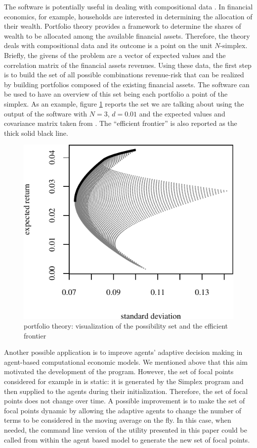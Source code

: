 \documentclass{jors}
\begin{document}
The software is potentially useful in dealing with compositional data \cite{coda15}. In financial economics, for example, households are interested in determining the allocation of their wealth. Portfolio theory provides a framework to determine the shares of wealth to be allocated among the available financial assets. Therefore, the theory deals with compositional data and its outcome is a point on the unit $N$-simplex. 
Briefly, the givens of the problem are a vector of expected values and the correlation matrix of the financial assets revenues. Using these data, the first step is to build the set of all possible combinations revenue-risk that can be realized by building portfolios composed of the existing financial assets. The software can be used to have an overview of this set being each portfolio a point of the simplex. 
As an example, figure \ref{fig:portfolios} reports the set we are talking about using the output of the software with $N=3$, $d=0.01$ and the expected values and covariance matrix taken from \cite{zivot2008}. 
The ``efficient frontier'' is also reported as the thick solid black line.  

\begin{figure}[ht]
	\centering
	\includegraphics[scale=1.0]{set-0.pdf}
	\caption{portfolio theory: visualization of the possibility set and the efficient frontier}
	\label{fig:portfolios}
\end{figure}


Another possible application is to improve agents' adaptive decision making in agent-based computational economic models. 
We mentioned above that this aim motivated the development of the program.  
However, the set of focal points considered for example in \cite{icaart12} is static: it is generated by the Simplex program and then supplied to the agents during their initialization. Therefore, the set of focal points does not change over time. A possible improvement is to make the set of focal points dynamic by allowing the adaptive agents to change the number of terms to be considered in the moving average on the fly. In this case, when needed, the command line version of the utility presented in this paper could be called from within the agent based model to generate the new set of focal points.
\end{document}
